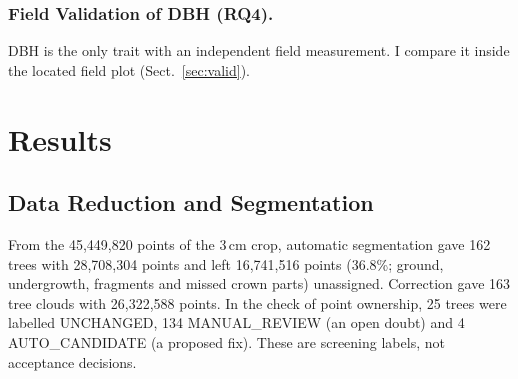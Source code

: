 \documentclass[runningheads]{llncs}
\begin{document}
\subsubsection{Field Validation of DBH (RQ4).}
DBH is the only trait with an independent field measurement. I compare it inside the located field plot (Sect.~\ref{sec:valid}).

\section{Results}\label{sec:results}

\subsection{Data Reduction and Segmentation}\label{sec:res-seg}
From the 45,449,820 points of the 3\,cm crop, automatic segmentation gave 162 trees with 28,708,304 points and left 16,741,516 points (36.8\%; ground, undergrowth, fragments and missed crown parts) unassigned. Correction gave 163 tree clouds with 26,322,588 points. In the check of point ownership, 25 trees were labelled UNCHANGED, 134 MANUAL\_REVIEW (an open doubt) and 4 AUTO\_CANDIDATE (a proposed fix). These are screening labels, not acceptance decisions.
\end{document}
